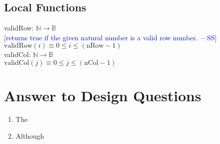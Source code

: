\documentclass[12pt]{article}
\newcommand{\authornote}[3]{\textcolor{#1}{[#3 ---#2]}}
\newcommand{\authornote}[3]{}
\newcommand{\wss}[1]{\authornote{blue}{SS}{#1}}
\begin{document}
\subsection*{Local Functions}

\noindent validRow: $\mathbb{N} \rightarrow \mathbb{B}$\\
\noindent \wss{returns true if the given natural number is a valid row
  number.}$\mbox{validRow}(i) \equiv 0 \leq i \leq (\mbox{nRow} - 1)$\\

\noindent validCol: $\mathbb{N} \rightarrow \mathbb{B}$\\
\noindent $\mbox{validCol}(j) \equiv 0 \leq j \leq (\mbox{nCol} - 1)$\\

\newpage

\section*{Answer to Design Questions}

\begin{enumerate}
\item The 

\item Although 
 
\end{enumerate}
\end{document}
